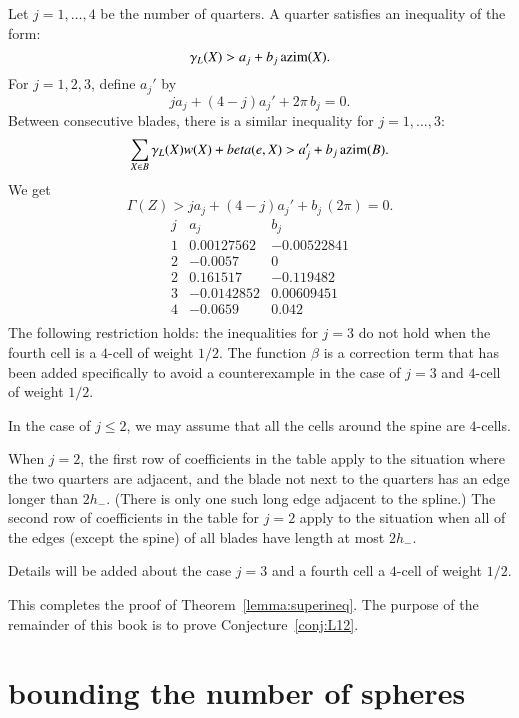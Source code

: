 Let $j=1,\ldots,4$ be the number of quarters.
A quarter satisfies an inequality of the form:
$$
\gamma_L(X) > a_j + b_j\, {\operatorname{azim}}(X).
$$
For $j=1,2,3$, define $a_j'$ by
$$
  j a _j + (4-j) a_j' + 2\pi\,b_j = 0.
$$
Between consecutive blades, there is a similar inequality for $j=1,\ldots,3$:
$$
\sum_{X\in B} \gamma_L(X)w(X) +beta(e,X) > a_j' + b_j\,{\operatorname{azim}}(B).
$$
We get
\begin{equation}\label{eqn:4bl}
  \Gamma(Z) > j a_j + (4-j) a_j' + b_j\, (2\pi) = 0.
\end{equation}
$$
\begin{matrix}  j&a_j&b_j\\
   1&0.00127562& -0.00522841\\
   2&-0.0057&0\\
   2&0.161517&-0.119482\\
   3&-0.0142852& 0.00609451\\
   4&-0.0659&0.042\\
   \end{matrix}
   $$
The following restriction holds:  the inequalities for $j=3$ do not hold when the fourth cell is a $4$-cell of weight $1/2$.  The function $\beta$ is a correction term that has been added specifically to avoid a counterexample in the case of $j=3$ and $4$-cell of weight $1/2$.

In the case of $j\le 2$, we may assume that all the cells around the spine are $4$-cells.  

When $j=2$, the first row of coefficients in the table apply to the situation where the two quarters are adjacent, and the blade not next to the quarters has an edge longer than $2h_-$.  (There is only one such long edge adjacent to the spline.)  The second row of coefficients in the table for $j=2$ apply to the situation when all of the edges (except the spine) of all blades have length at most $2h_-$.

\begin{note} %
Details will be added about the case $j=3$ and a fourth cell a $4$-cell of weight $1/2$.
\end{note}


\smallskip

This completes the proof of Theorem~\ref{lemma:superineq}.  The purpose of the remainder of this book is to prove Conjecture~\ref{conj:L12}.



\section{bounding the number of spheres}

